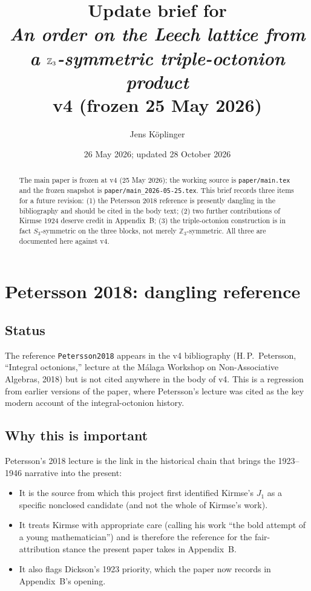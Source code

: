 \documentclass[11pt]{amsart}
\title[Update brief: Petersson reference; Kirmse; $S_3$ symmetry]%
{Update brief for\\
\emph{An order on the Leech lattice from a $\ZZ_3$-symmetric
triple-octonion product}\\
\large v4 (frozen 25 May 2026)}
\author{Jens K\"oplinger}
\date{26 May 2026; updated 28 October 2026}
\newcommand{\ZZ}{\mathbb{Z}}
\theoremstyle{remark}
\begin{document}
\maketitle

\begin{abstract}
The main paper is frozen at v4 (25 May 2026); the working source is
\texttt{paper/main.tex} and the frozen snapshot is
\texttt{paper/main\_2026-05-25.tex}.  This brief records three items
for a future revision: (1) the Petersson 2018 reference is presently
dangling in the bibliography and should be cited in the body text;
(2) two further contributions of Kirmse 1924 deserve credit in
Appendix~B; (3) the triple-octonion construction is in fact
$S_3$-symmetric on the three blocks, not merely $\ZZ_3$-symmetric.  All
three are documented here against v4.
\end{abstract}

\section{Petersson 2018: dangling reference}

\subsection*{Status}

The reference \texttt{Petersson2018} appears in the v4 bibliography
(H.\,P.~Petersson, ``Integral octonions,'' lecture at the M\'alaga
Workshop on Non-Associative Algebras, 2018) but is not cited
anywhere in the body of v4.  This is a regression from earlier
versions of the paper, where Petersson's lecture was cited as the
key modern account of the integral-octonion history.

\subsection*{Why this is important}

Petersson's 2018 lecture is the link in the historical chain that
brings the 1923--1946 narrative into the present:
\begin{itemize}
\item It is the source from which this project first identified
  Kirmse's $J_1$ as a specific nonclosed candidate (and not the
  whole of Kirmse's work).
\item It treats Kirmse with appropriate care (calling his work
  ``the bold attempt of a young mathematician'') and is therefore
  the reference for the fair-attribution stance the present paper
  takes in Appendix~B.
\item It also flags Dickson's 1923 priority, which the paper now
  records in Appendix~B's opening.
\end{itemize}
\end{document}
